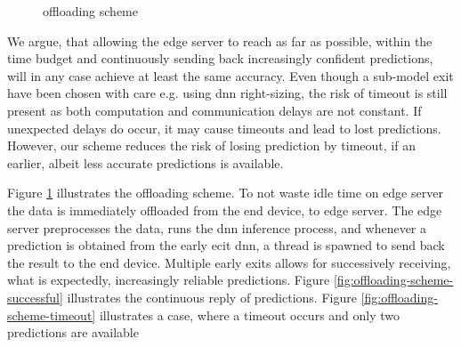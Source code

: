 \begin{figure}
	\captionsetup[subfigure]{justification=centering}
	\centering
\end{figure}
\begin{figure}
		\captionsetup[subfigure]{justification=centering}
	\centering
	\caption[Offloading scheme]{offloading scheme}
	\label{fig:offloading-scheme}
\end{figure} 

We argue, that allowing the edge server to reach as far as possible, within the time budget and continuously sending back increasingly confident predictions, will in any case achieve at least the same accuracy. Even though a sub-model exit have been chosen with care e.g. using \gls{dnn} right-sizing, the risk of timeout is still present as both computation and communication delays are not constant. If unexpected delays do occur, it may cause timeouts and lead to lost predictions. However, our scheme reduces the risk of losing prediction by timeout, if an earlier, albeit less accurate predictions is available. 

Figure \ref{fig:offloading-scheme} illustrates the offloading scheme. To not waste idle time on edge server the data is immediately offloaded from the end device, to edge server. The edge server preprocesses the data, runs the \gls{dnn} inference process, and whenever a prediction is obtained from the early ecit \gls{dnn}, a thread is spawned to send back the result to the end device. Multiple early exits allows for successively receiving, what is expectedly, increasingly reliable predictions. Figure \ref{fig:offloading-scheme-successful} illustrates the continuous reply of predictions. Figure \ref{fig:offloading-scheme-timeout} illustrates a case, where a timeout occurs and only two predictions are available 

